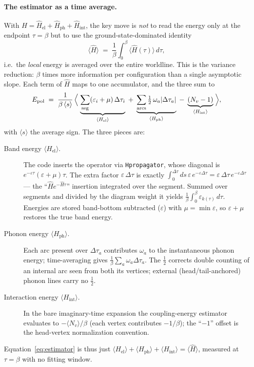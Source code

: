 \documentclass[11pt]{article}
\begin{document}
\paragraph{The estimator as a time average.}
With $\hat H=\hat H_{\mathrm{el}}+\hat H_{\mathrm{ph}}+\hat H_{\mathrm{int}}$, the key
move is \emph{not} to read the energy only at the endpoint $\tau=\beta$ but to use the
ground-state-dominated identity
\begin{equation}
  \langle\hat H\rangle \;=\; \frac1\beta\int_{0}^{\beta}\langle\hat H(\tau)\rangle\,d\tau,
  \label{eq:timeavg}
\end{equation}
i.e.\ the \emph{local} energy is averaged over the entire worldline. This is the
variance reduction: $\beta$ times more information per configuration than a single
asymptotic slope. Each term of $\hat H$ maps to one accumulator, and the three sum to
\begin{equation}
  E_{\mathrm{pol}}
  \;=\; \frac{1}{\beta\,\langle s\rangle}\,
  \Bigl\langle\;
    \underbrace{\sum_{\mathrm{seg}}(\varepsilon_{i}+\mu)\,\Delta\tau_{i}}_{\langle H_{\mathrm{el}}\rangle}
    \;+\;
    \underbrace{\sum_{\mathrm{arcs}}\tfrac12\,\omega_{a}\lvert\Delta\tau_{a}\rvert}_{\langle H_{\mathrm{ph}}\rangle}
    \;-\;
    \underbrace{(N_{v}-1)}_{\langle H_{\mathrm{int}}\rangle}
  \;\Bigr\rangle,
  \label{eq:estimator}
\end{equation}
with $\langle s\rangle$ the average sign. The three pieces are:
\begin{description}
  \item[Band energy $\langle H_{\mathrm{el}}\rangle$.] The code inserts the operator via
    \texttt{Hpropagator}, whose diagonal is $e^{-\varepsilon\tau}(\varepsilon+\mu)\tau$.
    The extra factor $\varepsilon\,\Delta\tau$ is exactly
    $\int_{0}^{\Delta\tau}\!ds\,\varepsilon\,e^{-\varepsilon\Delta\tau}
     =\varepsilon\,\Delta\tau\,e^{-\varepsilon\Delta\tau}$ --- the ``$\hat H e^{-\hat H\tau}$''
    insertion integrated over the segment. Summed over segments and divided by the
    diagram weight it yields $\tfrac1\beta\int_{0}^{\beta}\varepsilon_{k(\tau)}\,d\tau$.
    Energies are stored band-bottom subtracted ($\varepsilon$) with $\mu=\min\varepsilon$,
    so $\varepsilon+\mu$ restores the true band energy.
  \item[Phonon energy $\langle H_{\mathrm{ph}}\rangle$.] Each arc present over
    $\Delta\tau_{a}$ contributes $\omega_{a}$ to the instantaneous phonon energy;
    time-averaging gives $\tfrac1\beta\sum_{a}\omega_{a}\Delta\tau_{a}$. The $\tfrac12$
    corrects double counting of an internal arc seen from both its vertices; external
    (head/tail-anchored) phonon lines carry no $\tfrac12$.
  \item[Interaction energy $\langle H_{\mathrm{int}}\rangle$.] In the bare imaginary-time
    expansion the coupling-energy estimator evaluates to $-\langle N_{v}\rangle/\beta$
    (each vertex contributes $-1/\beta$); the ``$-1$'' offset is the head-vertex
    normalization convention.
\end{description}
Equation~\eqref{eq:estimator} is thus just
$\langle H_{\mathrm{el}}\rangle+\langle H_{\mathrm{ph}}\rangle+\langle H_{\mathrm{int}}\rangle
 =\langle\hat H\rangle$, measured at $\tau=\beta$ with no fitting window.
\end{document}
